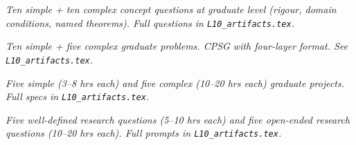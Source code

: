 \begin{tcolorbox}[gradconceptbox, title={SCQG + CCQG · L10 · Tiers 4–5}]
\textit{Ten simple + ten complex concept questions at graduate level (rigour, domain
conditions, named theorems). Full questions in \texttt{L10_artifacts.tex}.}
\end{tcolorbox}

\begin{tcolorbox}[gradprobbox, title={SPSG + CPSG · L10 · Tiers 4–5}]
\textit{Ten simple + five complex graduate problems.
CPSG with four-layer format. See \texttt{L10_artifacts.tex}.}
\end{tcolorbox}

\begin{tcolorbox}[gradprobbox, title={SPJG (×5) + CPJG (×5) · L10 · Tiers 4–5}]
\textit{Five simple (3–8 hrs each) and five complex (10–20 hrs each) graduate projects.
Full specs in \texttt{L10_artifacts.tex}.}
\end{tcolorbox}

\begin{tcolorbox}[researchbox, title={WRQ (×5) + ORQ (×5) · L10 · Tiers 4–5}]
\textit{Five well-defined research questions (5–10 hrs each) and five open-ended
research questions (10–20 hrs each). Full prompts in \texttt{L10_artifacts.tex}.}
\end{tcolorbox}
